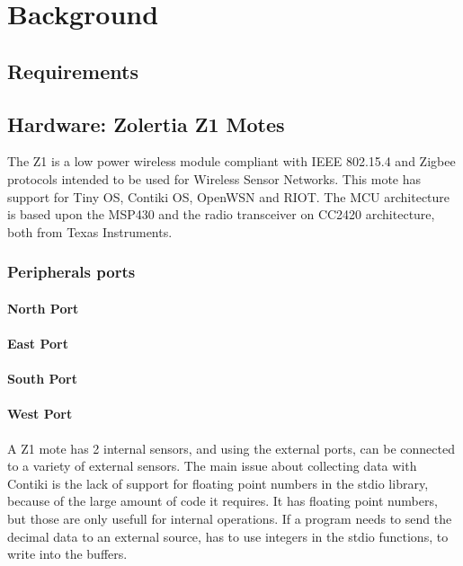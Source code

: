 \section{Background}

\subsection{Requirements}

\subsection{Hardware: Zolertia Z1 Motes}

The Z1 is a low power wireless module compliant with IEEE 802.15.4 and Zigbee protocols intended to be used for Wireless Sensor Networks.
This mote has support for Tiny OS,
	Contiki OS,
	OpenWSN and RIOT.
The MCU architecture is based upon the MSP430 and the radio transceiver on CC2420 architecture,
	both from Texas Instruments.

\subsubsection{Peripherals ports}

\paragraph{North Port}
\paragraph{East Port}
\paragraph{South Port}
\paragraph{West Port}


A Z1 mote has 2 internal sensors,
	and using the external ports,
	can be connected to a variety of external sensors.
The main issue about collecting data with Contiki is the lack of support for floating point numbers in the stdio library,
	because of the large amount of code it requires.
It has floating point numbers,
	but those are only usefull for internal operations.
If a program needs to send the decimal data to an external source,
	has to use integers in the stdio functions,
	to write into the buffers.


